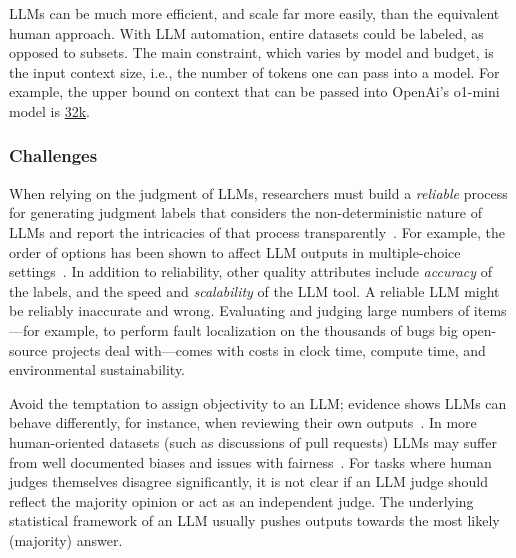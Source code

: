 LLMs can be much more efficient, and scale far more easily, than the equivalent human approach. With LLM automation, entire datasets could be labeled, as opposed to subsets. The main constraint, which varies by model and budget, is the input context size, i.e., the number of tokens one can pass into a model. For example, the upper bound on context that can be passed into OpenAi's \textsf{o1-mini} model is \href{https://help.openai.com/en/articles/9855712-openai-o1-models-faq-chatgpt-enterprise-and-edu}{32k}. 

\subsubsection{Challenges}

When relying on the judgment of LLMs, researchers must build a \textit{reliable} process for generating judgment labels that considers the non-deterministic nature of LLMs and report the intricacies of that process transparently~\cite{DBLP:journals/corr/abs-2412-12509}. For example, the order of options has been shown to affect LLM outputs in multiple-choice settings~\cite{DBLP:conf/naacl/PezeshkpourH24}. 
In addition to reliability, other quality attributes include \textit{accuracy} of the labels, and the speed and \textit{scalability} of the LLM tool. 
A reliable LLM might be reliably inaccurate and wrong. 
Evaluating and judging large numbers of items---for example, to perform fault localization on the thousands of bugs big open-source projects deal with---comes with costs in clock time, compute time, and environmental sustainability.

Avoid the temptation to assign objectivity to an LLM; evidence shows LLMs can behave differently, for instance, when reviewing their own outputs~\cite{NEURIPS2024_7f1f0218}. In more human-oriented datasets (such as discussions of pull requests) LLMs may suffer from well documented biases and issues with fairness~\cite{Gallegos2024BiasAF}. 
For tasks where human judges themselves disagree significantly, it is not clear if an LLM judge should reflect the majority opinion or act as an independent judge. The underlying statistical framework of an LLM usually pushes outputs towards the most likely (majority) answer. 

